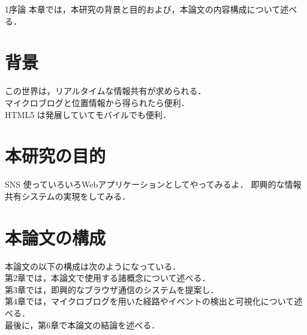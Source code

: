 \chapterhead
{1}{序論}
{本章では，本研究の背景と目的および，本論文の内容構成について述べる．}

\section{背景}
この世界は，リアルタイムな情報共有が求められる．\\
マイクロブログと位置情報から得られたら便利．\\
HTML5 は発展していてモバイルでも便利．\\


\newpage

\section{本研究の目的}
SNS 使っていろいろWebアプリケーションとしてやってみるよ．
即興的な情報共有システムの実現をしてみる．

\newpage

\section{本論文の構成}
本論文の以下の構成は次のようになっている．\\
第2章では，本論文で使用する諸概念について述べる．\\
第3章では，即興的なブラウザ通信のシステムを提案し．\\
第4章では，マイクロブログを用いた経路やイベントの検出と可視化について述べる．\\
最後に，第6章で本論文の結論を述べる．\\
